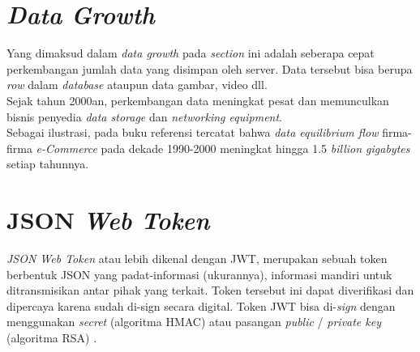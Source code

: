 	\section{  \textit{Data Growth}}
	Yang dimaksud dalam \textit{data growth} pada \textit{section} ini adalah seberapa cepat perkembangan jumlah data yang disimpan oleh server. Data tersebut bisa berupa \textit{row} dalam \textit{database} ataupun data gambar, video dll\cite{insidebigdata_exponential_2017}.
	\\ \indent
	Sejak tahun 2000an, perkembangan data meningkat pesat dan memunculkan bisnis penyedia \textit{data storage} dan \textit{networking equipment}.
	\\ \indent Sebagai ilustrasi, pada buku referensi tercatat bahwa \textit{data equilibrium flow} firma-firma \textit{e-Commerce} pada dekade 1990-2000 meningkat hingga 1.5 \textit{billion gigabytes} setiap tahunnya\cite{d._vanhoose_e-commerce_2011}.
	
	
	\section{  JSON \textit{Web Token}}
	\textit{JSON Web Token }atau lebih dikenal dengan JWT, merupakan sebuah token berbentuk JSON yang padat-informasi (ukurannya), informasi mandiri untuk ditransmisikan antar pihak yang terkait. Token tersebut ini dapat diverifikasi dan dipercaya karena sudah di-sign secara digital. Token JWT bisa di-\textit{sign} dengan menggunakan \textit{secret} (algoritma HMAC) atau pasangan \textit{public} / \textit{private key} (algoritma RSA) \cite{noauthor_jwt_2016}.
	
